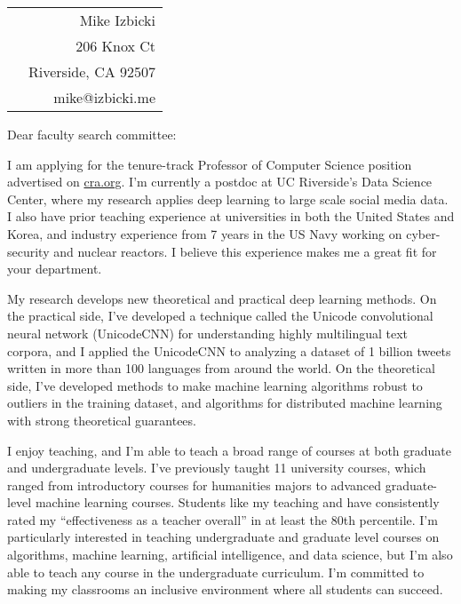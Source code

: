\documentclass[12pt]{article}
\begin{document}
\noindent
\hspace{-0.13in}
\begin{tabularx}{1.03\textwidth}{Xr}
 & Mike Izbicki \\
 & 206 Knox Ct\\
 & Riverside, CA 92507\\
 & mike@izbicki.me\\
\end{tabularx}

\vspace{0.25in}

\setlength{\parskip}{15pt plus4mm minus3mm}

\noindent
Dear faculty search committee:

\noindent
I am applying for the tenure-track Professor of Computer Science position advertised on \url{cra.org}.
I'm currently a postdoc at UC Riverside's Data Science Center,
where my research applies deep learning to large scale social media data.
I also have prior teaching experience at universities in both the United States and Korea, and
industry experience from 7 years in the US Navy working on cyber-security and nuclear reactors.
I believe this experience makes me a great fit for your department.

\noindent
My research develops new theoretical and practical deep learning methods.
On the practical side, I've developed a technique called the Unicode convolutional neural network (UnicodeCNN) for understanding highly multilingual text corpora,
and I applied the UnicodeCNN to analyzing a dataset of 1 billion tweets written in more than 100 languages from around the world.
On the theoretical side, I've developed methods to make machine learning algorithms robust to outliers in the training dataset, 
and algorithms for distributed machine learning with strong theoretical guarantees.

\noindent
I enjoy teaching,
and I'm able to teach a broad range of courses at both graduate and undergraduate levels.
I've previously taught 11 university courses,
which ranged from introductory courses for humanities majors to advanced graduate-level machine learning courses.
Students like my teaching and have consistently rated my ``effectiveness as a teacher overall'' in at least the 80th percentile.
I'm particularly interested in teaching undergraduate and graduate level courses on algorithms, machine learning, artificial intelligence, and data science,
but I'm also able to teach any course in the undergraduate curriculum.
I'm committed to making my classrooms an inclusive environment where all students can succeed.
\end{document}
